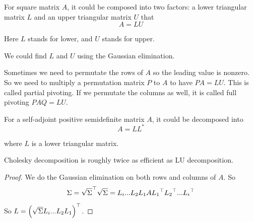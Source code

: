 \begin{theorem}[LU Decomposition]
    For square matrix $A$, it could be composed into two factors: a lower triangular matrix $L$ and an upper triangular matrix $U$ that
    \begin{equation}
        A = LU
    \end{equation}
    
    Here $L$ stands for lower, and $U$ stands for upper.
    
    We could find $L$ and $U$ using the Gaussian elimination.
    
    Sometimes we need to permutate the rows of $A$ so the leading value is nonzero. So we need to multiply a permutation matrix $P$ to $A$ to have $PA = LU$. This is called partial pivoting. If we permutate the columns as well, it is called full pivoting $PAQ = LU$.
\end{theorem}

\begin{theorem}
    For a self-adjoint positive semidefinite matrix $A$, it could be decomposed into 
    \begin{equation}
        A = L L^*
    \end{equation}
    
    where $L$ is a lower triangular matrix.
    
    Cholesky decomposition is roughly twice as efficient as LU decomposition.
\end{theorem}
\begin{proof}
    We do the Gaussian elimination on both rows and columns of $A$. So 
    \begin{equation}
        \Sigma = {\sqrt{\Sigma}}^\top \sqrt{\Sigma} = L_i ... L_2 L_1 A {L_1}^\top {L_2}^\top ... {L_i}^\top
    \end{equation}
    
    So $L = {\left(\sqrt{\Sigma}L_i ... L_2 L_1\right)}^\top$.
\end{proof}

























